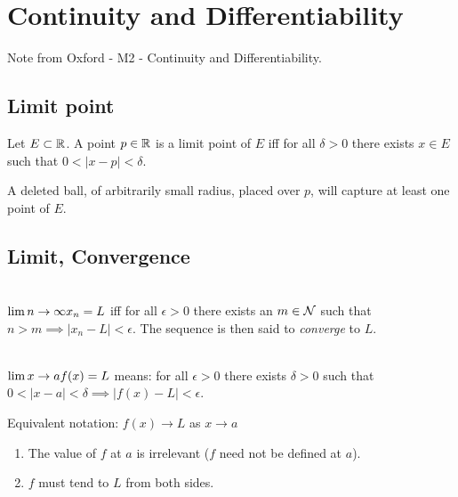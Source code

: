 \section{Continuity and Differentiability}
Note from Oxford - M2 - Continuity and Differentiability.

\subsection{Limit point}
\begin{definition*}
Let $E \subset \mathbb{R}$. A point $p \in \mathbb{R}$ is a limit point of $E$ iff for all $\delta > 0$ there
exists $x \in E$ such that $0 < |x - p| < \delta$.
\end{definition*}
\begin{intuition*}
  A deleted ball, of arbitrarily small radius, placed over $p$, will capture at least one point of
  $E$.
\end{intuition*}

\subsection{Limit, Convergence}

\begin{definition*}~\\
$\LimEq{x_n}{L}{n}{\infty}$ iff for all $\epsilon > 0$ there exists an $m \in \mathcal{N}$ such that
$n > m \implies |x_n - L| < \epsilon$. The sequence is then said to \textit{converge} to $L$.
\end{definition*}

\begin{definition*}~\\
$\LimEq{f(x)}{L}{x}{a}$ means: for all $\epsilon > 0$ there exists $\delta > 0$ such that
$0 < |x - a| < \delta \implies |f(x) - L| < \epsilon$.
\end{definition*}

Equivalent notation: $f(x) \to L$ as $x \to a$

\begin{remark*}\hspace{0pt}
  \begin{enumerate}
  \item The value of $f$ at $a$ is irrelevant ($f$ need not be defined at $a$).
  \item $f$ must tend to $L$ from both sides.
  \end{enumerate}
\end{remark*}


